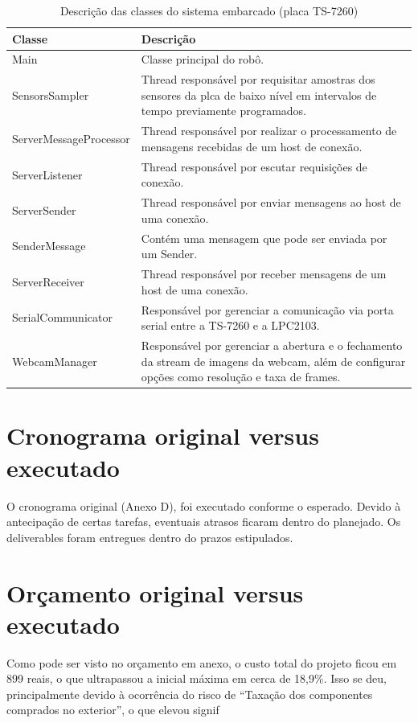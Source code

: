 \begin{table}[H]
  \centering
  \caption{Descrição das classes do sistema embarcado (placa TS-7260)}
  \begin{tabular}{p{6cm}p{8cm}}
    \toprule
    \textbf{Classe} & \textbf{Descrição} \\ 
    \midrule
   Main & Classe principal do robô. \\ \hline
   SensorsSampler & Thread responsável por requisitar amostras dos sensores da plca de baixo nível em intervalos de tempo previamente programados. \\ \hline
   ServerMessageProcessor & Thread responsável por realizar o processamento de mensagens recebidas de um host de conexão. \\ \hline
   ServerListener & Thread responsável por escutar requisições de conexão. \\ \hline
   ServerSender & Thread responsável por enviar mensagens ao host de uma conexão. \\ \hline
   SenderMessage & Contém uma mensagem que pode ser enviada por um Sender. \\ \hline
   ServerReceiver & Thread responsável por receber mensagens de um host de uma conexão. \\ \hline
   SerialCommunicator & Responsável por gerenciar a comunicação via porta serial entre a TS-7260 e a LPC2103.\\ \hline
   WebcamManager & Responsável por gerenciar a abertura e o fechamento da stream de imagens da webcam, além de configurar opções como resolução e taxa de frames. \\
   \bottomrule
  \end{tabular}%
  \label{tab:classes_ts}%
\end{table}%

\section{Cronograma original versus executado}
O cronograma original (Anexo D), foi executado conforme o esperado. Devido à antecipação de certas tarefas, eventuais atrasos ficaram dentro do planejado. Os deliverables foram entregues dentro do prazos estipulados.

\section{Orçamento original versus executado}
Como pode ser visto no orçamento em anexo, o custo total do projeto ficou em 899 reais, o que ultrapassou a inicial máxima em cerca de 18,9\%. Isso se deu, principalmente devido à ocorrência do risco de ``Taxação dos componentes comprados no exterior'', o que elevou signif